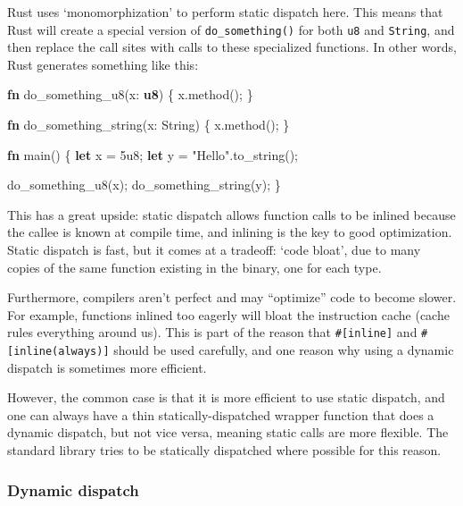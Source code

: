 \documentclass[a4paper,]{book}
\newenvironment{Shaded}{\begin{snugshade}}{\end{snugshade}}
\newcommand{\KeywordTok}[1]{\textcolor[rgb]{0.13,0.29,0.53}{\textbf{{#1}}}}
\newcommand{\DecValTok}[1]{\textcolor[rgb]{0.00,0.00,0.81}{{#1}}}
\newcommand{\StringTok}[1]{\textcolor[rgb]{0.31,0.60,0.02}{{#1}}}
\newcommand{\NormalTok}[1]{{#1}}
\begin{document}
Rust uses `monomorphization' to perform static dispatch here. This means
that Rust will create a special version of \texttt{do\_something()} for
both \texttt{u8} and \texttt{String}, and then replace the call sites
with calls to these specialized functions. In other words, Rust
generates something like this:

\begin{Shaded}
\begin{Highlighting}[]
\KeywordTok{fn} \NormalTok{do_something_u8(x: }\KeywordTok{u8}\NormalTok{) \{}
    \NormalTok{x.method();}
\NormalTok{\}}

\KeywordTok{fn} \NormalTok{do_something_string(x: String) \{}
    \NormalTok{x.method();}
\NormalTok{\}}

\KeywordTok{fn} \NormalTok{main() \{}
    \KeywordTok{let} \NormalTok{x = }\DecValTok{5u8}\NormalTok{;}
    \KeywordTok{let} \NormalTok{y = }\StringTok{"Hello"}\NormalTok{.to_string();}

    \NormalTok{do_something_u8(x);}
    \NormalTok{do_something_string(y);}
\NormalTok{\}}
\end{Highlighting}
\end{Shaded}

This has a great upside: static dispatch allows function calls to be
inlined because the callee is known at compile time, and inlining is the
key to good optimization. Static dispatch is fast, but it comes at a
tradeoff: `code bloat', due to many copies of the same function existing
in the binary, one for each type.

Furthermore, compilers aren't perfect and may ``optimize'' code to
become slower. For example, functions inlined too eagerly will bloat the
instruction cache (cache rules everything around us). This is part of
the reason that \texttt{\#{[}inline{]}} and
\texttt{\#{[}inline(always){]}} should be used carefully, and one reason
why using a dynamic dispatch is sometimes more efficient.

However, the common case is that it is more efficient to use static
dispatch, and one can always have a thin statically-dispatched wrapper
function that does a dynamic dispatch, but not vice versa, meaning
static calls are more flexible. The standard library tries to be
statically dispatched where possible for this reason.

\subsubsection{Dynamic dispatch}\label{dynamic-dispatch}
\end{document}

